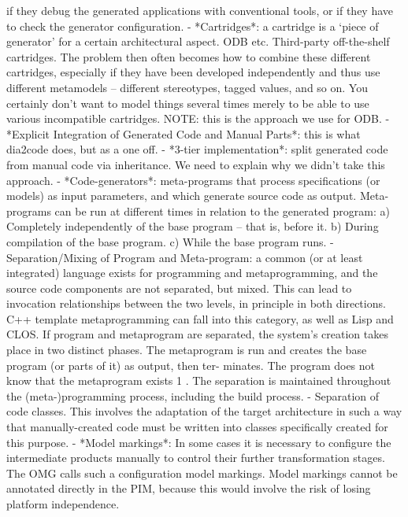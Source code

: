 \documentclass{book}
\begin{document}
  if they debug the generated applications with conventional tools, or
  if they have to check the generator configuration.
- *Cartridges*: a cartridge is a ‘piece of generator’ for a certain
  architectural aspect. ODB etc. Third-party off-the-shelf
  cartridges. The problem then often becomes how to combine these
  different cartridges, especially if they have been developed
  independently and thus use different metamodels – different
  stereotypes, tagged values, and so on. You certainly don’t want to
  model things several times merely to be able to use various
  incompatible cartridges. NOTE: this is the approach we use for ODB.
- *Explicit Integration of Generated Code and Manual Parts*: this is
  what dia2code does, but as a one off.
- *3-tier implementation*: split generated code from manual code via
  inheritance. We need to explain why we didn't take this approach.
- *Code-generators*: meta-programs that process specifications (or
  models) as input parameters, and which generate source code as
  output. Meta-programs can be run at different times in relation to
  the generated program: a) Completely independently of the base
  program – that is, before it. b) During compilation of the base
  program. c) While the base program runs.
- Separation/Mixing of Program and Meta-program: a common (or at least
  integrated) language exists for programming and metaprogramming, and
  the source code components are not separated, but mixed. This can
  lead to invocation relationships between the two levels, in
  principle in both directions. C++ template metaprogramming can fall
  into this category, as well as Lisp and CLOS. If program and
  metaprogram are separated, the system’s creation takes place in two
  distinct phases. The metaprogram is run and creates the base program
  (or parts of it) as output, then ter- minates. The program does not
  know that the metaprogram exists 1 . The separation is maintained
  throughout the (meta-)programming process, including the build
  process.
- Separation of code classes. This involves the adaptation of the
  target architecture in such a way that manually-created code must be
  written into classes specifically created for this purpose.
- *Model markings*: In some cases it is necessary to configure the
  intermediate products manually to control their further
  transformation stages. The OMG calls such a configuration model
  markings. Model markings cannot be annotated directly in the PIM,
  because this would involve the risk of losing platform independence.
\end{document}
